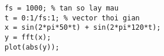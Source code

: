 
\begin{lstlisting}[caption={Hàm chính xử lý tín hiệu}]
    % Ham xu ly tin hieu
    fs = 1000; % tan so lay mau
    t = 0:1/fs:1; % vector thoi gian
    x = sin(2*pi*50*t) + sin(2*pi*120*t);
    y = fft(x);
    plot(abs(y));
\end{lstlisting}